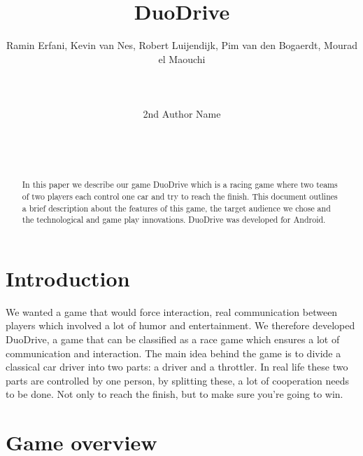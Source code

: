 \documentclass{sigchi}
\begin{document}
\title{DuoDrive}

\author{
  \alignauthor Ramin Erfani, Kevin van Nes, Robert Luijendijk, Pim van den Bogaerdt, Mourad el Maouchi\\
    \\
    \\
    \\
  \alignauthor 2nd Author Name\\
    \\
    \\
    \\
}

\maketitle

\begin{abstract}
In this paper we describe our game DuoDrive
which is a racing game where two teams of
two players each control one car and try to
reach the finish. This document outlines a brief
description about the features of this game, the target
audience we chose and the technological and
game play innovations. DuoDrive was developed
for Android.
\end{abstract}


\section{Introduction}

We wanted a game that would force interaction, real communication between players which involved a lot of humor and entertainment. We therefore developed DuoDrive, a game that can be classified as a race game which ensures a lot of communication and interaction. The main idea behind the game is to divide a classical car driver into two parts: a driver and a throttler. In real life these two parts are controlled by one person, by splitting these, a lot of cooperation needs to be done. Not only to reach the finish, but to make sure you're going to win.

\section{Game overview}
\end{document}
